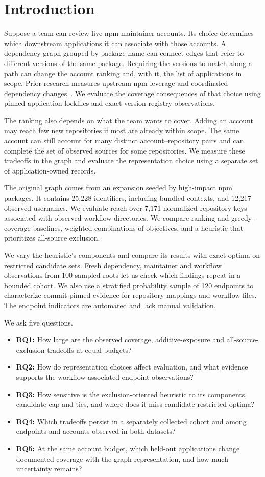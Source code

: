 \section{Introduction}
Suppose a team can review five npm maintainer accounts. Its choice determines which downstream applications it can associate with those accounts. A dependency graph grouped by package name can connect edges that refer to different versions of the same package. Requiring the versions to match along a path can change the account ranking and, with it, the list of applications in scope. Prior research measures upstream npm leverage and coordinated dependency changes~\cite{samaana2025,he2025}. We evaluate the coverage consequences of that choice using pinned application lockfiles and exact-version registry observations.

The ranking also depends on what the team wants to cover. Adding an account may reach few new repositories if most are already within scope. The same account can still account for many distinct account--repository pairs and can complete the set of observed sources for some repositories. We measure these tradeoffs in the graph and evaluate the representation choice using a separate set of application-owned records.

The original graph comes from an expansion seeded by high-impact npm packages. It contains 25,228 identifiers, including bundled contexts, and 12,217 observed usernames. We evaluate reach over 7,171 normalized repository keys associated with observed workflow directories. We compare ranking and greedy-coverage baselines, weighted combinations of objectives, and a heuristic that prioritizes all-source exclusion.

We vary the heuristic's components and compare its results with exact optima on restricted candidate sets. Fresh dependency, maintainer and workflow observations from 100 sampled roots let us check which findings repeat in a bounded cohort. We also use a stratified probability sample of 120 endpoints to characterize commit-pinned evidence for repository mappings and workflow files. The endpoint indicators are automated and lack manual validation.

We ask five questions.
\begin{itemize}
\item \textbf{RQ1:} How large are the observed coverage, additive-exposure and all-source-exclusion tradeoffs at equal budgets?
\item \textbf{RQ2:} How do representation choices affect evaluation, and what evidence supports the workflow-associated endpoint observations?
\item \textbf{RQ3:} How sensitive is the exclusion-oriented heuristic to its components, candidate cap and ties, and where does it miss candidate-restricted optima?
\item \textbf{RQ4:} Which tradeoffs persist in a separately collected cohort and among endpoints and accounts observed in both datasets?
\item \textbf{RQ5:} At the same account budget, which held-out applications change documented coverage with the graph representation, and how much uncertainty remains?
\end{itemize}


